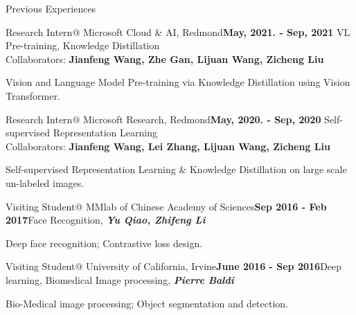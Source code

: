 \documentclass{resume} %
\begin{document}
\begin{rSection}{Previous Experiences}


\begin{rSubsection}{Research Intern@ Microsoft Cloud \& AI, Redmond}\hfill{\textbf{May, 2021. - Sep, 2021}}{ VL Pre-training, Knowledge Distillation \\Collaborators: \hfill\textbf{Jianfeng Wang, Zhe Gan, Lijuan Wang, Zicheng Liu}}
\item{Vision and Language Model Pre-training via Knowledge Distillation using Vision Transformer. }
\end{rSubsection}

\begin{rSubsection}{Research Intern@ Microsoft Research, Redmond}\hfill{\textbf{May, 2020. - Sep, 2020}}{ Self-supervised Representation Learning \\Collaborators: \hfill \textbf{Jianfeng Wang, Lei Zhang, Lijuan Wang, Zicheng Liu}}
\item{Self-supervised Representation Learning \& Knowledge Distillation on large scale un-labeled images.}
\end{rSubsection}

\begin{rSubsection}{Visiting Student@ MMlab of Chinese Academy of Sciences}\hfill{\textbf{Sep 2016 - Feb 2017}}{Face Recognition, \textbf{\textit{Yu Qiao, Zhifeng Li}}}{}
\item Deep face recognition; Contrastive loss design.
\end{rSubsection}

\begin{rSubsection}{Visiting Student@ University of California, Irvine}\hfill{\textbf{June 2016 - Sep 2016}}{Deep learning, Biomedical Image processing,  \textbf{\textit{Pierre Baldi}}}{}
\item Bio-Medical image processing; Object segmentation and detection.
\end{rSubsection} 

\end{rSection}
\end{document}
